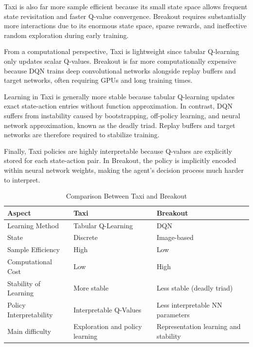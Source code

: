 \documentclass[11pt]{article}
\begin{document}
Taxi is also far more sample efficient because its small state space allows frequent state revisitation and faster Q-value convergence. Breakout requires substantially more interactions due to its enormous state space, sparse rewards, and ineffective random exploration during early training.

From a computational perspective, Taxi is lightweight since tabular Q-learning only updates scalar Q-values. Breakout is far more computationally expensive because DQN trains deep convolutional networks alongside replay buffers and target networks, often requiring GPUs and long training times.

Learning in Taxi is generally more stable because tabular Q-learning updates exact state-action entries without function approximation. In contrast, DQN suffers from instability caused by bootstrapping, off-policy learning, and neural network approximation, known as the deadly triad. Replay buffers and target networks are therefore required to stabilize training.

Finally, Taxi policies are highly interpretable because Q-values are explicitly stored for each state-action pair. In Breakout, the policy is implicitly encoded within neural network weights, making the agent’s decision process much harder to interpret.

\begin{table}[H]
\centering
\caption{Comparison Between Taxi and Breakout}
\label{tab:taxi_breakout_comparison}

\begin{tabular}{|p{4cm}|p{4cm}|p{6.5cm}|}
\hline
\textbf{Aspect} & \centering\textbf{Taxi} & \centering\textbf{Breakout} \arraybackslash \\
\hline
Learning Method & Tabular Q-Learning & DQN \\
\hline
State & Discrete & Image-based \\
\hline
Sample Efficiency & High & Low \\
\hline
Computational Cost & Low & High \\
\hline
Stability of Learning & More stable & Less stable (deadly triad)\\
\hline
Policy Interpretability & Interpretable Q-Values & Less interpretable NN parameters \\
\hline
Main difficulty & Exploration and policy learning & Representation learning and stability \\
\hline
\end{tabular}

\end{table}
\end{document}
